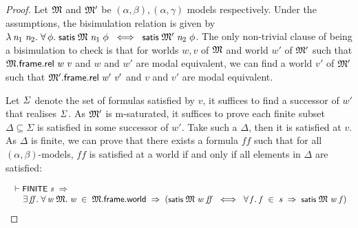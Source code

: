 \documentclass[letterpaper]{article}
\renewcommand{\HOLConst}[1]{{\textsf{\upshape\small #1}}}
\renewcommand{\HOLinline}[1]{\ensuremath{#1}}
\newenvironment{holmath}{\begin{displaymath}\begin{array}{l}}{\end{array}\end{displaymath}\ignorespacesafterend}
\begin{document}
\begin{proof}
Let \HOLinline{\HOLFreeVar{\ensuremath{\mathfrak{M}}}} and \HOLinline{\HOLFreeVar{\ensuremath{\mathfrak{M}'}}} be $(\alpha,\beta),(\alpha,\gamma)$ models respectively. Under the assumptions, the bisimulation relation is given by \HOLinline{\HOLTokenLambda{}\HOLBoundVar{n\sb{\mathrm{1}}}\;\HOLBoundVar{n\sb{\mathrm{2}}}.\;\HOLSymConst{\HOLTokenForall{}}\HOLBoundVar{\ensuremath{\phi}}.\;\HOLConst{satis}\;\HOLFreeVar{\ensuremath{\mathfrak{M}}}\;\HOLBoundVar{n\sb{\mathrm{1}}}\;\HOLBoundVar{\ensuremath{\phi}}\;\HOLSymConst{\HOLTokenEquiv{}}\;\HOLConst{satis}\;\HOLFreeVar{\ensuremath{\mathfrak{M}'}}\;\HOLBoundVar{n\sb{\mathrm{2}}}\;\HOLBoundVar{\ensuremath{\phi}}}. The only non-trivial clause of being a bisimulation to check is that for worlds $w,v$ of \HOLinline{\HOLFreeVar{\ensuremath{\mathfrak{M}}}} and world $w'$ of \HOLinline{\HOLFreeVar{\ensuremath{\mathfrak{M}'}}} such that \HOLinline{\HOLFreeVar{\ensuremath{\mathfrak{M}}}.\HOLFieldName{frame}.\HOLFieldName{rel}\;\HOLFreeVar{w}\;\HOLFreeVar{v}} and $w$ and $w'$ are modal equivalent, we can find a world $v'$ of \HOLinline{\HOLFreeVar{\ensuremath{\mathfrak{M}'}}} such that \HOLinline{\HOLFreeVar{\ensuremath{\mathfrak{M}'}}.\HOLFieldName{frame}.\HOLFieldName{rel}\;\HOLFreeVar{w\sp{\prime}}\;\HOLFreeVar{v\sp{\prime}}} and $v$ and $v'$ are modal equivalent. 

Let \HOLinline{\HOLFreeVar{\ensuremath{\Sigma}}} denote the set of formulas satisfied by $v$, it suffices to find a successor of $w'$ that realises \HOLinline{\HOLFreeVar{\ensuremath{\Sigma}}}. As \HOLinline{\HOLFreeVar{\ensuremath{\mathfrak{M}'}}} is m-saturated, it suffices to prove each finite subset $\Delta\subseteq \Sigma$ is satisfied in some successor of $w'$. Take such a $\Delta$, then it is satisfied at $v$. As $\Delta$ is finite, we can prove that there exists a formula $ff$ such that for all $(\alpha,\beta)$-models, $ff$ is satisfied at a world if and only if all elements in $\Delta$ are satisfied:

\begin{holmath}
  \ensuremath{\HOLTokenTurnstile}\HOLConst{FINITE}\;\HOLFreeVar{s}\;\HOLSymConst{\HOLTokenImp{}}\\
\;\;\;\;\;\HOLSymConst{\HOLTokenExists{}}\HOLBoundVar{ff}.\;\HOLSymConst{\HOLTokenForall{}}\HOLBoundVar{w}\;\HOLBoundVar{\ensuremath{\mathfrak{M}}}.\;\HOLBoundVar{w}\;\HOLSymConst{\HOLTokenIn{}}\;\HOLBoundVar{\ensuremath{\mathfrak{M}}}.\HOLFieldName{frame}.\HOLFieldName{world}\;\HOLSymConst{\HOLTokenImp{}}\;(\HOLConst{satis}\;\HOLBoundVar{\ensuremath{\mathfrak{M}}}\;\HOLBoundVar{w}\;\HOLBoundVar{ff}\;\HOLSymConst{\HOLTokenEquiv{}}\;\HOLSymConst{\HOLTokenForall{}}\HOLBoundVar{f}.\;\HOLBoundVar{f}\;\HOLSymConst{\HOLTokenIn{}}\;\HOLFreeVar{s}\;\HOLSymConst{\HOLTokenImp{}}\;\HOLConst{satis}\;\HOLBoundVar{\ensuremath{\mathfrak{M}}}\;\HOLBoundVar{w}\;\HOLBoundVar{f})
\end{holmath}


\end{proof}
\end{document}
